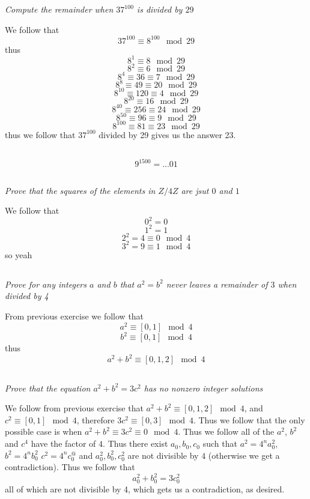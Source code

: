 \documentclass[11pt,oneside,titlepage]{book}
\begin{document}
\textit{Compute the remainder when $37^{100}$ is divided by $29$}

We follow that 
$$37^{100} \equiv 8^{100} \mod {29}$$
thus
$$8^ 1 \equiv 8 \mod{29}$$
$$8^ 2 \equiv 6 \mod{29}$$
$$8^ 4 \equiv 36 \equiv 7 \mod{29}$$
$$8^{8} \equiv 49 \equiv 20 \mod{29}$$
$$8^{10} \equiv 120 \equiv 4 \mod{29}$$
$$8^{20} \equiv 16 \mod{29}$$
$$8^{40} \equiv 256 \equiv 24 \mod{29}$$
$$8^{50} \equiv 96 \equiv 9 \mod{29}$$
$$8^{100} \equiv 81 \equiv 23 \mod{29}$$
thus we follow that $37^{100}$ divided by 29 gives us the answer 23.

\subsection{}

$$9^{1500} = ...01$$

\subsection{}

\textit{Prove that the squares of the elements in $Z/4Z$ are jsut $0$ and $1$}

We follow that
$$0^2 = 0$$
$$1^2 = 1$$
$$2^2 = 4 \equiv 0 \mod 4 $$
$$3^2 = 9 \equiv 1\mod 4 $$
so yeah

\subsection{}

\textit{Prove for any integers $a$ and $b$ that $a^2 = b^2$ never leaves a remainder of $3$
  when divided by 4}

From previous exercise we follow that
$$a^2 \equiv [0, 1] \mod 4$$
$$b^2 \equiv [0, 1] \mod 4$$
thus
$$a^2 + b^2  \equiv [0, 1, 2] \mod 4$$

\subsection{}

\textit{Prove that the equation $a^2 + b^2 = 3c^2$ has no nonzero integer solutions}

We follow from previous exercise that $a^2 + b^2 \equiv [0, 1, 2] \mod 4$, and
$c^2 \equiv [0, 1] \mod 4$, therefore $3c^2 \equiv [0, 3] \mod 4$. Thus we follow that
the only possible case is when $a^2 + b^2 \equiv 3c^2 \equiv 0 \mod 4$. Thus we follow
all of the $a^2$, $b^2$ and $c^4$ have the factor of $4$. Thus there exist
$a_0, b_0, c_0$ such that $a^2 = 4^n a_0^2$, $b^2 = 4^n b_0^2$ $c^2 = 4^n c_0^@$
and $a_0^2, b_0^2, c_0^2$ are not divisible by $4$ (otherwise we get a contradiction).
Thus we follow that
$$a_0^2 +  b_0^2 = 3c_0^2$$
all of which are not divisible by 4, which gets us a contradiction, as desired.
\end{document}
